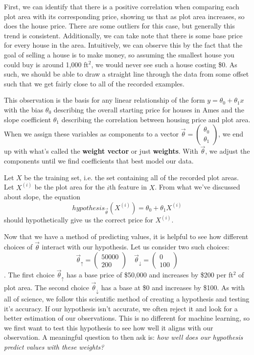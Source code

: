 First, we can identify that there is a positive correlation when comparing each
plot area with its corresponding price, showing us that as plot area increases,
so does the house price. There are some outliers for this case, but generally
this trend is consistent. Additionally, we can take note that there is some
base price for every house in the area. Intuitively, we can
observe this by the fact that the goal of selling a house is to make money, so
assuming the smallest house you could buy is around 1,000 ft$^2$, we would
never see such a house costing \$0. As such, we should be able to draw a
straight line through the data from some offset such that we get fairly close
to all of the recorded examples.

This observation is the basis for any linear relationship of the form
$y=\theta_0 + \theta_1x$ with the bias $\theta_0$ describing the overall
starting price for houses in Ames and the slope coefficient $\theta_1$
describing the correlation between housing price and plot area. When we assign
these variables as components to a vector $\vec\theta = \begin{pmatrix}\theta_0
\\ \theta_1\end{pmatrix}$, we end up with what's called the  \textbf{weight
vector} or just \textbf{weights}. With $\vec\theta$, we adjust the components
until we find coefficients that best model our data. 

Let $X$ be the training set, i.e. the set containing all of the
recorded plot areas. Let $X^{(i)}$ be the plot area for the $i$th feature in
$X$. From what we've discussed about slope, the equation
\begin{equation}
    hypothesis_{\vec\theta}(X^{(i)}) = \theta_0 + \theta_1X^{(i)}
\end{equation}
should hypothetically give us the correct price for $X^{(i)}$.

Now that we have a method of predicting values, it is helpful to see how different choices of $\vec\theta$ interact with our hypothesis. Let us consider two such choices:
\begin{equation*}
	\vec\theta_{\uparrow} = \begin{pmatrix}50000 \\ 200\end{pmatrix} \quad 	\vec\theta_{\downarrow} = \begin{pmatrix}0 \\ 100\end{pmatrix}
\end{equation*}
. The first choice $\vec\theta_{\uparrow}$ has a base price of \$50,000 and increases by \$200 per ft$^2$ of plot area. The second choice $\vec\theta_{\downarrow}$ has a base at \$0 and increases by \$100. As with all of science, we follow this scientific method of creating a hypothesis and testing it's accuracy. If our hypothesis isn't accurate, we often reject it and look for a better estimation of our observations. This is no different for machine learning, so we first want to test this hypothesis to see how well it aligns with our observation. A meaningful question to then ask is: \emph{how well does our hypothesis predict values with these weights?}

